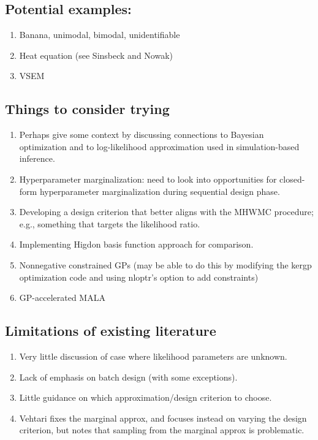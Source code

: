 \documentclass[12pt]{article}
\begin{document}
\subsection{Potential examples:}
\begin{enumerate}
\item Banana, unimodal, bimodal, unidentifiable
\item Heat equation (see Sinsbeck and Nowak) 
\item VSEM
\end{enumerate}

\subsection{Things to consider trying}
\begin{enumerate}
\item Perhaps give some context by discussing connections to Bayesian optimization and to log-likelihood approximation used in 
simulation-based inference. 
\item Hyperparameter marginalization: need to look into opportunities for closed-form hyperparameter marginalization during 
sequential design phase. 
\item Developing a design criterion that better aligns with the MHWMC procedure; e.g., something that targets the likelihood ratio. 
\item Implementing Higdon basis function approach for comparison. 
\item Nonnegative constrained GPs (may be able to do this by modifying the kergp optimization code and using nloptr's option to add constraints) 
\item GP-accelerated MALA 
\end{enumerate}

\subsection{Limitations of existing literature}
\begin{enumerate}
\item Very little discussion of case where likelihood parameters are unknown. 
\item Lack of emphasis on batch design (with some exceptions).
\item Little guidance on which approximation/design criterion to choose.
\item Vehtari fixes the marginal approx, and focuses instead on varying the design criterion, but notes that sampling from the marginal approx is problematic. 
\end{enumerate}
\end{document}
